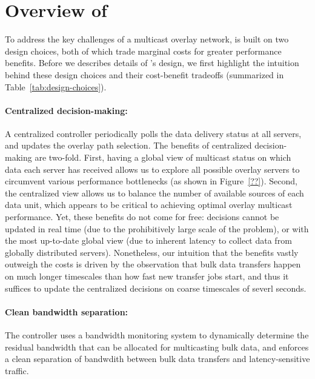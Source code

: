 \section{Overview of \name}
\label{sec:overview}

To address the key challenges of a multicast overlay network,
\name is built on two design choices, both of which
trade marginal costs for greater performance benefits. 
Before we describes details of \name's design, we first
highlight the intuition behind these design choices and
their cost-benefit tradeoffs 
(summarized in Table~\ref{tab:design-choices}).


\paragraph{Centralized decision-making:}
A centralized controller periodically polls the data delivery
status at all servers, and updates the overlay path selection.
The benefits of centralized decision-making are
two-fold. 
First, having a global view of multicast status on which data 
each server has received allows us to explore all possible 
overlay servers to circumvent various performance bottlenecks 
(as shown in Figure~\ref{??}). 
Second, the centralized view allows us to 
balance the number of available
sources of each data unit, which appears to be critical to 
achieving optimal overlay multicast performance.
Yet, these benefits do not come for free: decisions 
cannot be updated in real time 
(due to the prohibitively large scale of the problem),
or with the most up-to-date global view (due to inherent latency
to collect data from globally distributed servers).
Nonetheless, our intuition that the benefits vastly outweigh the
costs is driven by the observation that bulk data transfers 
happen on much longer timescales than how fast new transfer jobs 
start, and thus it suffices to update the centralized decisions 
on coarse timescales of severl seconds.

\paragraph{Clean bandwidth separation:}
The controller uses a bandwidth monitoring system to dynamically
determine the residual bandwidth that can be allocated for 
multicasting bulk data, and enforces a clean separation of 
bandwdith between bulk data transfers and latency-sensitive 
traffic.


